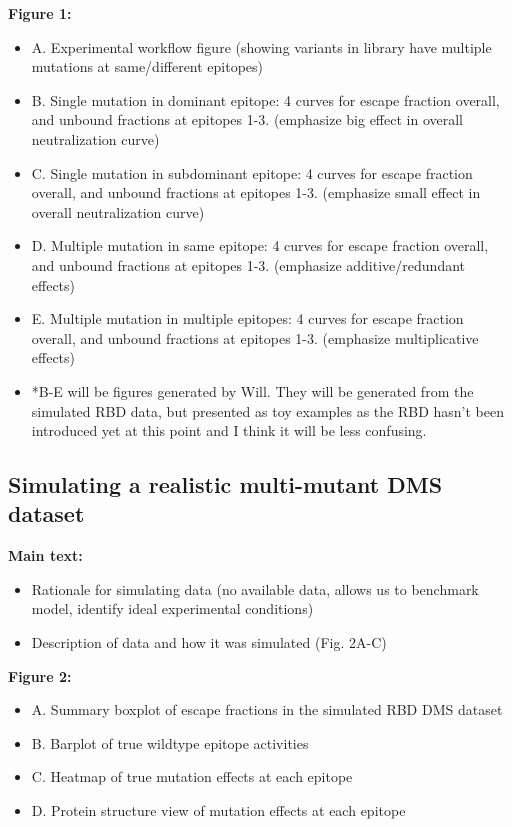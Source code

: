 \documentclass{article}
\begin{document}
\noindent\textbf{Figure 1:}
\begin{itemize}
	\item A. Experimental workflow figure (showing variants in library have multiple mutations at same/different epitopes)
	\item B. Single mutation in dominant epitope: 4 curves for escape fraction overall, and unbound fractions at epitopes 1-3. (emphasize big effect in overall neutralization curve)
	\item C. Single mutation in subdominant epitope: 4 curves for escape fraction overall, and unbound fractions at epitopes 1-3. (emphasize small effect in overall neutralization curve)
	\item D. Multiple mutation in same epitope: 4 curves for escape fraction overall, and unbound fractions at epitopes 1-3. (emphasize additive/redundant effects)
	\item E. Multiple mutation in multiple epitopes: 4 curves for escape fraction overall, and unbound fractions at epitopes 1-3. (emphasize multiplicative effects)
	\item *B-E will be figures generated by Will. They will be generated from the simulated RBD data, but presented as toy examples as the RBD hasn't been introduced yet at this point and I think it will be less confusing.
\end{itemize}

\subsection*{Simulating a realistic multi-mutant DMS dataset}

\textbf{Main text:}
\begin{itemize}
	\item Rationale for simulating data (no available data, allows us to benchmark model, identify ideal experimental conditions)
	\item Description of data and how it was simulated (Fig. 2A-C)
\end{itemize}


\noindent\textbf{Figure 2:}
\begin{itemize}
	\item A. Summary boxplot of escape fractions in the simulated RBD DMS dataset
	\item B. Barplot of true wildtype epitope activities
	\item C. Heatmap of true mutation effects at each epitope
	\item D. Protein structure view of mutation effects at each epitope
\end{itemize}
\end{document}
